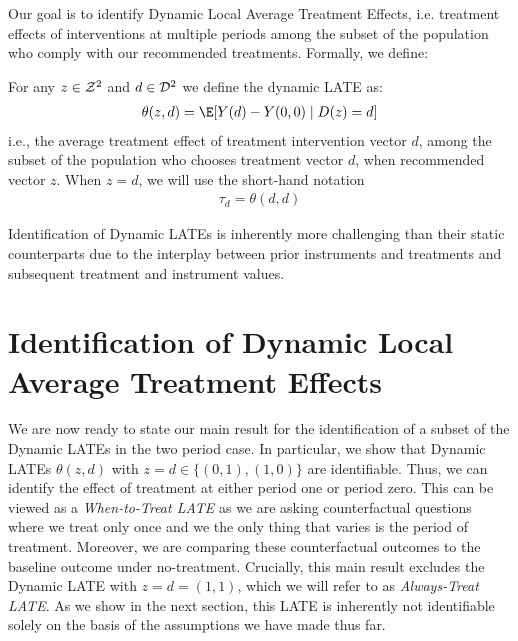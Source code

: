 Our goal is to identify Dynamic Local Average Treatment Effects, i.e. treatment effects of interventions at multiple periods among the subset of the population who comply with our recommended treatments. Formally, we define:
\begin{definition}\label{def:dyn_late} For any $z\in {\cal Z}^2$ and $d\in {\cal D}^2$ we define the dynamic LATE as:
\begin{align}
    \theta(z,d) = \E[Y(d) - Y(0,0)\mid D(z)=d]
\end{align}
i.e., the average treatment effect of treatment intervention vector $d$, among the subset of the population who chooses treatment vector $d$, when recommended vector $z$. When $z=d$, we will use the short-hand notation 
\begin{align}
    \tau_d = \theta(d,d)
\end{align}
\end{definition}

Identification of Dynamic LATEs is inherently more challenging than their static counterparts due to the interplay between prior instruments and treatments and subsequent treatment and instrument values. 

\section{Identification of Dynamic Local Average Treatment Effects}

We are now ready to state our main result for the identification of a subset of the Dynamic LATEs in the two period case.
In particular, we show that Dynamic LATEs $\theta(z,d)$ with $z=d\in \{(0,1), (1,0)\}$ are identifiable.
Thus, we can identify the effect of treatment at either period one or period zero. This can be viewed as a \emph{When-to-Treat LATE} as we are asking counterfactual questions where we treat only once and we the only thing that varies is the period of treatment.
Moreover, we are comparing these counterfactual outcomes to the baseline outcome under no-treatment.
Crucially, this main result excludes the Dynamic LATE with $z=d=(1,1)$, which we will refer to as \emph{Always-Treat LATE}. As we show in the next section, this LATE is inherently not identifiable solely on the basis of the assumptions we have made thus far. 

